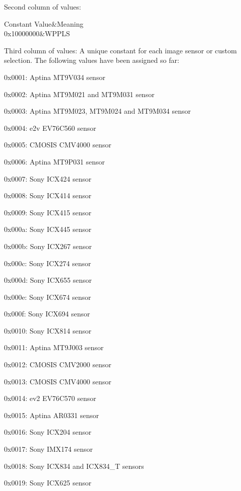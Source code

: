 Second column of values\+: \begin{TabularC}{2}
\hline
Constant Value&Meaning \\
0x10000000&W\+P\+P\+L\+S \\
\end{TabularC}


Third column of values\+: A unique constant for each image sensor or custom selection. The following values have been assigned so far\+:
\begin{DoxyItemize}
\item 0x0001\+: Aptina M\+T9\+V034 sensor
\item 0x0002\+: Aptina M\+T9\+M021 and M\+T9\+M031 sensor
\item 0x0003\+: Aptina M\+T9\+M023, M\+T9\+M024 and M\+T9\+M034 sensor
\item 0x0004\+: e2v E\+V76\+C560 sensor
\item 0x0005\+: C\+M\+O\+S\+I\+S C\+M\+V4000 sensor
\item 0x0006\+: Aptina M\+T9\+P031 sensor
\item 0x0007\+: Sony I\+C\+X424 sensor
\item 0x0008\+: Sony I\+C\+X414 sensor
\item 0x0009\+: Sony I\+C\+X415 sensor
\item 0x000a\+: Sony I\+C\+X445 sensor
\item 0x000b\+: Sony I\+C\+X267 sensor
\item 0x000c\+: Sony I\+C\+X274 sensor
\item 0x000d\+: Sony I\+C\+X655 sensor
\item 0x000e\+: Sony I\+C\+X674 sensor
\item 0x000f\+: Sony I\+C\+X694 sensor
\item 0x0010\+: Sony I\+C\+X814 sensor
\item 0x0011\+: Aptina M\+T9\+J003 sensor
\item 0x0012\+: C\+M\+O\+S\+I\+S C\+M\+V2000 sensor
\item 0x0013\+: C\+M\+O\+S\+I\+S C\+M\+V4000 sensor
\item 0x0014\+: ev2 E\+V76\+C570 sensor
\item 0x0015\+: Aptina A\+R0331 sensor
\item 0x0016\+: Sony I\+C\+X204 sensor
\item 0x0017\+: Sony I\+M\+X174 sensor
\item 0x0018\+: Sony I\+C\+X834 and I\+C\+X834\+\_\+T sensors
\item 0x0019\+: Sony I\+C\+X625 sensor

\end{DoxyItemize}
